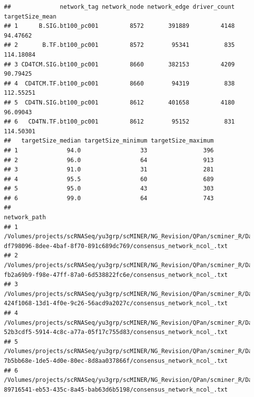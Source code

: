 \documentclass[
  12pt,
]{book}
\begin{document}
\begin{verbatim}
##              network_tag network_node network_edge driver_count targetSize_mean
## 1      B.SIG.bt100_pc001         8572       391889         4148        94.47662
## 2       B.TF.bt100_pc001         8572        95341          835       114.18084
## 3 CD4TCM.SIG.bt100_pc001         8660       382153         4209        90.79425
## 4  CD4TCM.TF.bt100_pc001         8660        94319          838       112.55251
## 5  CD4TN.SIG.bt100_pc001         8612       401658         4180        96.09043
## 6   CD4TN.TF.bt100_pc001         8612        95152          831       114.50301
##   targetSize_median targetSize_minimum targetSize_maximum
## 1              94.0                 33                396
## 2              96.0                 64                913
## 3              91.0                 31                281
## 4              95.5                 60                689
## 5              95.0                 43                303
## 6              99.0                 64                743
##                                                                                                                                                                                               network_path
## 1      /Volumes/projects/scRNASeq/yu3grp/scMINER/NG_Revision/QPan/scminer_R/Datasets/PBMC14K/SJARACNe/B/SIG/bt100_pc001/sjaracne_workflow-df798096-8dee-4baf-8f70-891c689dc769/consensus_network_ncol_.txt
## 2       /Volumes/projects/scRNASeq/yu3grp/scMINER/NG_Revision/QPan/scminer_R/Datasets/PBMC14K/SJARACNe/B/TF/bt100_pc001/sjaracne_workflow-fb2a69b9-f98e-47ff-87a0-6d538822fc6e/consensus_network_ncol_.txt
## 3 /Volumes/projects/scRNASeq/yu3grp/scMINER/NG_Revision/QPan/scminer_R/Datasets/PBMC14K/SJARACNe/CD4TCM/SIG/bt100_pc001/sjaracne_workflow-424f1068-13d1-4f0e-9c26-56acd9a2027c/consensus_network_ncol_.txt
## 4  /Volumes/projects/scRNASeq/yu3grp/scMINER/NG_Revision/QPan/scminer_R/Datasets/PBMC14K/SJARACNe/CD4TCM/TF/bt100_pc001/sjaracne_workflow-52b3cdf5-5914-4c8c-a77a-05f17c755d83/consensus_network_ncol_.txt
## 5  /Volumes/projects/scRNASeq/yu3grp/scMINER/NG_Revision/QPan/scminer_R/Datasets/PBMC14K/SJARACNe/CD4TN/SIG/bt100_pc001/sjaracne_workflow-7b5bb68e-1de5-4d0e-80ec-8d8aa037866f/consensus_network_ncol_.txt
## 6   /Volumes/projects/scRNASeq/yu3grp/scMINER/NG_Revision/QPan/scminer_R/Datasets/PBMC14K/SJARACNe/CD4TN/TF/bt100_pc001/sjaracne_workflow-89716541-eb53-435c-8a45-bab63d6b5198/consensus_network_ncol_.txt
\end{verbatim}
\end{document}
